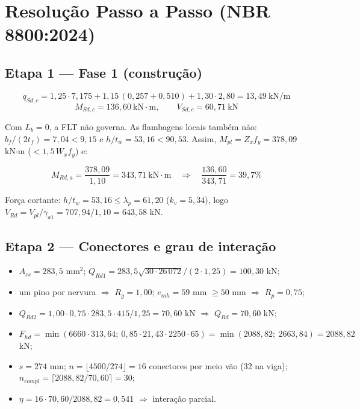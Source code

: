 \section{Resolução Passo a Passo (NBR 8800:2024)}\label{sec:4.2}

\subsection{Etapa 1 --- Fase 1 (construção)}
\[
  q_{Sd,c} = 1{,}25 \cdot 7{,}175 + 1{,}15\,(0{,}257 + 0{,}510) + 1{,}30 \cdot 2{,}80 = 13{,}49\ \text{kN/m}
\]
\[
  M_{Sd,c} = 136{,}60\ \text{kN}\cdot\text{m}, \qquad V_{Sd,c} = 60{,}71\ \text{kN}
\]

Com $L_b = 0$, a FLT não governa. As flambagens locais também não: $b_f/(2t_f) = 7{,}04 < 9{,}15$ e $h/t_w = 53{,}16 < 90{,}53$. Assim, $M_{pl} = Z_x f_y = 378{,}09$ kN\ensuremath{\cdot}m ($< 1{,}5\, W_x f_y$) e:

\[
  M_{Rd,a} = \frac{378{,}09}{1{,}10} = 343{,}71\ \text{kN}\cdot\text{m} \quad \Rightarrow \quad \frac{136{,}60}{343{,}71} = 39{,}7\%
\]

Força cortante: $h/t_w = 53{,}16 \le \lambda_p = 61{,}20$ ($k_v = 5{,}34$), logo $V_{Rd} = V_{pl}/\gamma_{a1} = 707{,}94/1{,}10 = 643{,}58$ kN.

\subsection{Etapa 2 --- Conectores e grau de interação}
\begin{itemize}
\item $A_{cs} = 283{,}5$ mm\ensuremath{^2}; $Q_{Rd1} = 283{,}5\sqrt{30 \cdot 26\,072}/(2 \cdot 1{,}25) = 100{,}30$ kN;
\item um pino por nervura \ensuremath{\Rightarrow} $R_g = 1{,}00$; $e_{mh} = 59$ mm $\ge 50$ mm \ensuremath{\Rightarrow} $R_p = 0{,}75$;
\item $Q_{Rd2} = 1{,}00 \cdot 0{,}75 \cdot 283{,}5 \cdot 415/1{,}25 = 70{,}60$ kN \ensuremath{\Rightarrow} $Q_{Rd} = 70{,}60$ kN;
\item $F_{hd} = \min(6660 \cdot 313{,}64;\ 0{,}85 \cdot 21{,}43 \cdot 2250 \cdot 65) = \min(2088{,}82;\ 2663{,}84) = 2088{,}82$ kN;
\item $s = 274$ mm; $n = \lfloor 4500/274 \rfloor = 16$ conectores por meio vão (32 na viga); $n_{compl} = \lceil 2088{,}82/70{,}60 \rceil = 30$;
\item $\eta = 16 \cdot 70{,}60/2088{,}82 = 0{,}541$ \ensuremath{\Rightarrow} interação parcial.
\end{itemize}

